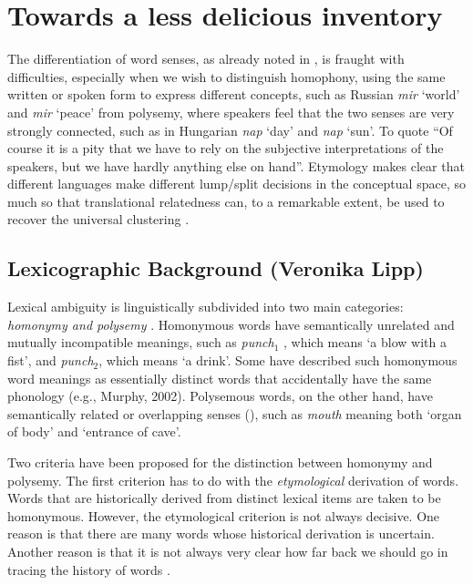 \documentclass[11pt]{article}
\begin{document}
\section{%
  Towards a less delicious 
  inventory}

The differentiation of word senses, as already noted in \cite{Borbely:2016}, is
fraught with difficulties, especially when we wish to distinguish homophony,
using the same written or spoken form to express different concepts, such as
Russian {\it mir} `world' and {\it mir} `peace' from polysemy, where speakers
feel that the two senses are very strongly connected, such as in Hungarian {\it
nap} `day' and {\it nap} `sun'.  To quote \cite{Zgusta:1971} ``Of course it is
a pity that we have to rely on the subjective interpretations of the speakers,
but we have hardly anything else on hand''. Etymology makes clear that
different languages make different lump/split decisions in the conceptual
space, so much so that translational relatedness can, to a remarkable extent,
be used to recover the universal clustering \citep{Youn:2016}.

\subsection{Lexicographic Background (Veronika Lipp)}

\label{sec:bground}

Lexical ambiguity is linguistically subdivided into two main categories:
\emph{homonymy and polysemy} \citep{Cruse:2004}. Homonymous words have
semantically unrelated and mutually incompatible meanings, such as
\emph{punch$_1$} , which means `a blow with a fist', and \emph{punch$_2$},
which means `a drink'. Some have described such homonymous word meanings as
essentially distinct words that accidentally have the same phonology (e.g.,
Murphy, 2002). Polysemous words, on the other hand, have semantically related
or overlapping senses (\cite{Cruse:2004,Jackendoff:2002, Pustejovsky:1995}),
such as \emph{mouth} meaning both `organ of body' and `entrance of cave'.

Two criteria have been proposed for the distinction between homonymy and
polysemy. The first criterion has to do with the \emph{etymological} derivation
of words. Words that are historically derived from distinct lexical items are
taken to be homonymous. However, the etymological criterion is not always
decisive. One reason is that there are many words whose historical derivation
is uncertain. Another reason is that it is not always very clear how far back
we should go in tracing the history of words \citep{Lyons:1977}.  
\end{document}
